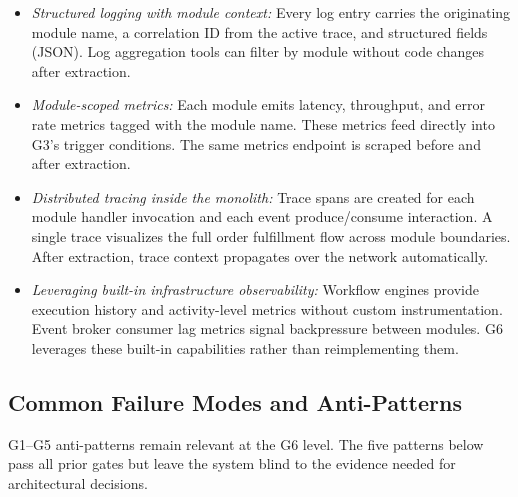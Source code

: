 \begin{itemize}[itemsep=8pt,topsep=2pt]
  \item \emph{Structured logging with module context:} Every log entry carries the originating module name, a correlation ID from the active trace, and structured fields (JSON). Log aggregation tools can filter by module without code changes after extraction.

  \item \emph{Module-scoped metrics:} Each module emits latency, throughput, and error rate metrics tagged with the module name. These metrics feed directly into G3's trigger conditions. The same metrics endpoint is scraped before and after extraction.

  \item \emph{Distributed tracing inside the monolith:} Trace spans are created for each module handler invocation and each event produce/consume interaction. A single trace visualizes the full order fulfillment flow across module boundaries. After extraction, trace context propagates over the network automatically.

  \item \emph{Leveraging built-in infrastructure observability:} Workflow engines provide execution history and activity-level metrics without custom instrumentation. Event broker consumer lag metrics signal backpressure between modules. G6 leverages these built-in capabilities rather than reimplementing them.
\end{itemize}

\subsection*{Common Failure Modes and Anti-Patterns}

G1--G5 anti-patterns remain relevant at the G6 level. The five patterns below pass all prior gates but leave the system blind to the evidence needed for architectural decisions.

